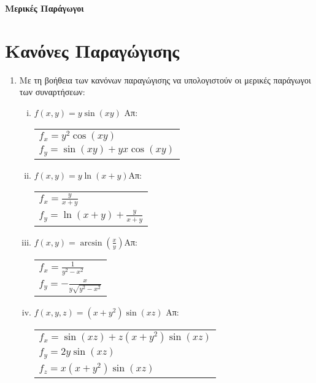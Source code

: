 



\pagestyle{askhseis}







\begin{center}
  {\color{Col1}\bfseries\large Μερικές Παράγωγοι}
\end{center} 

\section*{Κανόνες Παραγώγισης}

\begin{enumerate}
  \item Με τη βοήθεια των κανόνων παραγώγισης να υπολογιστούν οι μερικές 
    παράγωγοι των συναρτήσεων:

    \begin{enumerate}[i)]
      \item $f(x,y)=y\sin (xy)$ \hfill Απ: \begin{tabular}{l}
          $f_x=y^2\cos(xy)$ \\ 
          $f_y=\sin(xy)+yx\cos(xy)$
        \end{tabular}

      \item $f(x,y)=y\ln(x+y)$\hfill Απ: \begin{tabular}{l}
          $f_x=\frac{y}{x+y}$ \\ 
          $f_y=\ln(x+y)+\frac{y}{x+y}$
        \end{tabular}

      \item $f(x,y)=\arcsin(\frac{x}{y})$\hfill Απ: \begin{tabular}{l}
          $f_x=\frac{1}{y^2-x^2}$ \\ 
          $f_y=-\frac{x}{y\sqrt{y^2-x^2}}$
        \end{tabular}
      \item $ f(x,y,z) = (x+y^{2}) \sin{(xz)} $ \hfill Απ: \begin{tabular}{l}
          $ f_{x} = \sin{(xz)} + z(x+y^{2}) \sin{(xz)} $ \\
          $ f_{y} = 2y \sin{(xz)} $ \\
          $ f_{z} = x(x+y^{2}) \sin{(xz)} $
        \end{tabular} 
    \end{enumerate}


\end{enumerate}
